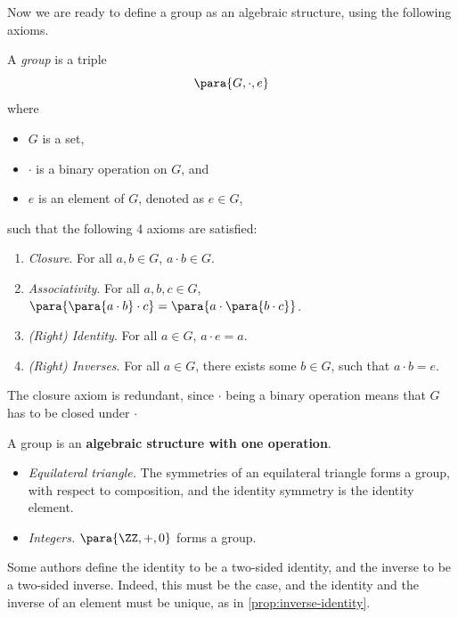 Now we are ready to define a group as an algebraic structure, using the following axioms.

\begin{definition}[Group]
    \label{def:group}%
    A \emph{group} is a triple
    \[
        \para{G, \cdot, e}
    \]
    where
    \begin{itemize}
        \item \(G\) is a set,
        \item \(\cdot\) is a binary operation on \(G\), and
        \item \(e\) is an element of \(G\), denoted as \(e \in G\),
    \end{itemize}
    such that the following 4 axioms are satisfied:
    \begin{enumerate}
        \item \emph{Closure}. For all \(a, b \in G\), \(a \cdot b \in G\).
        \item \emph{Associativity}. For all \(a, b, c \in G\), \(
        \para{\para{a \cdot b} \cdot c} = \para{a \cdot \para{b \cdot c}}\).
        \item \emph{(Right) Identity}. For all \(a \in G\), \(a \cdot e = a\).
        \item \emph{(Right) Inverses}. For all \(a \in G\), there exists some \(b \in G\), such that \(a \cdot b = e\).
    \end{enumerate}
\end{definition}

\begin{remark}
    The closure axiom is redundant, since \(\cdot\) being a binary operation means that \(G\) has to be closed under \(\cdot\)
\end{remark}

A group is an \textbf{algebraic structure with one operation}.

\begin{examples}
    \begin{itemize}
        \item \emph{Equilateral triangle.} The symmetries of an equilateral triangle forms a group, with respect to composition, and the identity symmetry is the identity element.
        \item \emph{Integers.} \(\para{\ZZ, +, 0}\) forms a group.
    \end{itemize}
\end{examples}

Some authors define the identity to be a two-sided identity, and the inverse to be a two-sided inverse. Indeed, this must be the case, and the identity and the inverse of an element must be unique, as in \autoref{prop:inverse-identity}.

